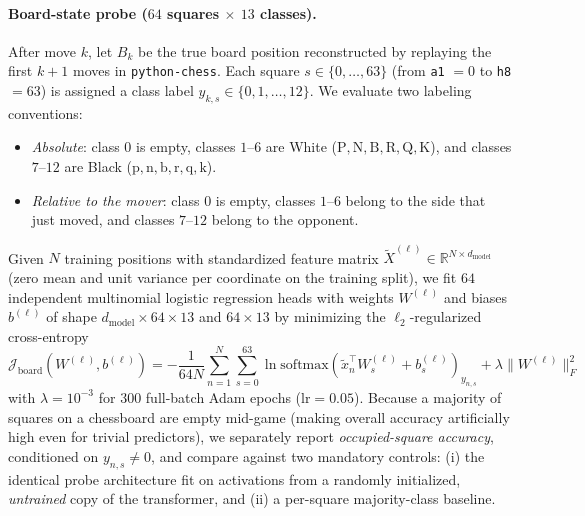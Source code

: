 \documentclass[11pt]{article}
\begin{document}
\paragraph{Board-state probe ($64$ squares $\times$ $13$ classes).} After move $k$, let $B_k$ be the true board position reconstructed by replaying the first $k+1$ moves in \texttt{python-chess}. Each square $s \in \{0, \dots, 63\}$ (from \texttt{a1} $= 0$ to \texttt{h8} $= 63$) is assigned a class label $y_{k,s} \in \{0, 1, \dots, 12\}$. We evaluate two labeling conventions:
\begin{itemize}
\item \emph{Absolute}: class $0$ is empty, classes $1$--$6$ are White ($\mathrm{P, N, B, R, Q, K}$), and classes $7$--$12$ are Black ($\mathrm{p, n, b, r, q, k}$).
\item \emph{Relative to the mover}: class $0$ is empty, classes $1$--$6$ belong to the side that just moved, and classes $7$--$12$ belong to the opponent.
\end{itemize}
Given $N$ training positions with standardized feature matrix $\tilde{X}^{(\ell)} \in \mathbb{R}^{N \times d_{\mathrm{model}}}$ (zero mean and unit variance per coordinate on the training split), we fit $64$ independent multinomial logistic regression heads with weights $W^{(\ell)}$ and biases $b^{(\ell)}$ of shape $d_{\mathrm{model}} \times 64 \times 13$ and $64 \times 13$ by minimizing the $\ell_2$-regularized cross-entropy
\begin{equation}
\mathcal{J}_{\mathrm{board}}(W^{(\ell)}, b^{(\ell)}) = -\frac{1}{64N}\sum_{n=1}^N \sum_{s=0}^{63} \ln \mathrm{softmax}\!\left(\tilde{x}_n^\top W^{(\ell)}_s + b^{(\ell)}_s\right)_{y_{n,s}} + \lambda \|W^{(\ell)}\|_F^2
\label{eq:probe-loss}
\end{equation}
with $\lambda = 10^{-3}$ for $300$ full-batch Adam epochs ($\text{lr}=0.05$). Because a majority of squares on a chessboard are empty mid-game (making overall accuracy artificially high even for trivial predictors), we separately report \emph{occupied-square accuracy}, conditioned on $y_{n,s} \neq 0$, and compare against two mandatory controls: (i) the identical probe architecture fit on activations from a randomly initialized, \emph{untrained} copy of the transformer, and (ii) a per-square majority-class baseline.
\end{document}
